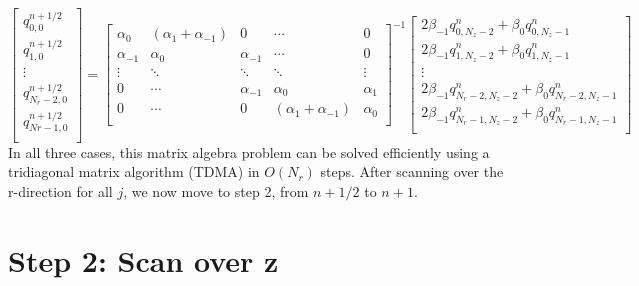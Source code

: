 \documentclass[11pt]{article} %
\begin{document}
\[  \begin{bmatrix}
q_{0,0}^{n+1/2} \\[0.5em]
q_{1,0}^{n+1/2} \\[0.5em]
\vdots \\[0.5em]
q_{N_r-2,0}^{n+1/2} \\[0.5em]
q_{Nr-1,0}^{n+1/2} \\[0.5em]
\end{bmatrix} = 
%
\begin{bmatrix}
\alpha_0 & (\alpha_1+\alpha_{-1}) & 0 & \cdots & 0 \\[0.5em]
\alpha_{-1} & \alpha_0 & \alpha_{-1} &\cdots &0 \\[0.5em]
\vdots & \ddots & \ddots & \ddots & \vdots \\[0.5em]
0 & \cdots & \alpha_{-1} & \alpha_0 & \alpha_1  \\[0.5em]
0 & \cdots & 0 & (\alpha_1+\alpha_{-1}) & \alpha_0 \\[0.5em]
\end{bmatrix}^{-1} 
%
\begin{bmatrix}
2\beta_{-1}q_{0,N_z-2}^{n}+ \beta_0q_{0,N_z-1}^{n} \\[0.5em]
2\beta_{-1}q_{1,N_z-2}^{n}+ \beta_0q_{1,N_z-1}^{n} \\[0.5em]
\vdots \\[0.5em]
2\beta_{-1}q_{N_r-2,N_z-2}^{n}+\beta_0q_{N_r-2,N_z-1}^{n} \\[0.5em]
2\beta_{-1}q_{N_r-1,N_z-2}^{n}+ \beta_0q_{N_r-1,N_z-1}^{n} \\[0.5em]
\end{bmatrix}
\]
\noindent
In all three cases, this matrix algebra problem can be solved efficiently using a tridiagonal matrix algorithm (TDMA) in $O(N_r)$ steps. After scanning over the r-direction for all $j$, we now move to step 2, from $n+1/2$ to $n+1$. 

\section*{Step 2: Scan over z}
\end{document}
